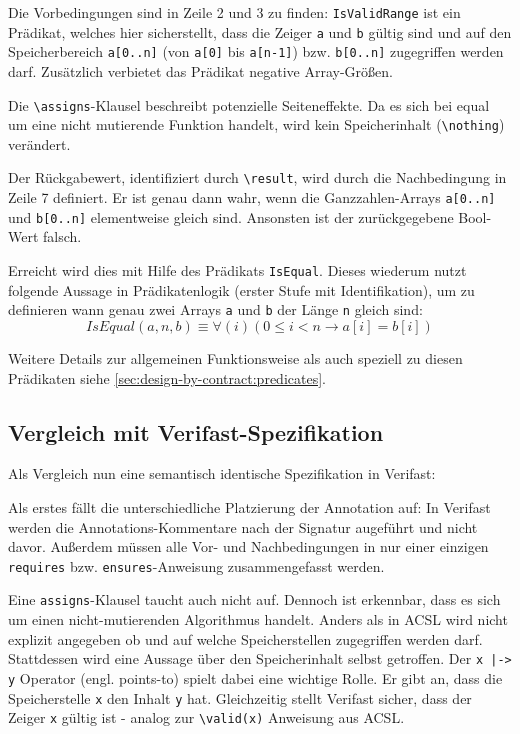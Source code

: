 Die Vorbedingungen sind in Zeile 2 und 3 zu finden: \lstinline{IsValidRange} ist ein Prädikat, welches hier sicherstellt,
dass die Zeiger \lstinline{a} und \lstinline{b} gültig sind und auf den Speicherbereich \lstinline{a[0..n]} 
(von \lstinline{a[0]} bis \lstinline{a[n-1]}) bzw. \lstinline{b[0..n]} zugegriffen 
werden darf. Zusätzlich verbietet das Prädikat negative Array-Größen.

Die \lstinline{\assigns}-Klausel beschreibt potenzielle Seiteneffekte. Da es sich bei equal um eine nicht mutierende
Funktion handelt, wird kein Speicherinhalt (\lstinline{\nothing}) verändert.

Der Rückgabewert, identifiziert durch \lstinline{\result}, wird durch die Nachbedingung in Zeile 7 definiert. Er ist genau dann
wahr, wenn die Ganzzahlen-Arrays \lstinline{a[0..n]} und \lstinline{b[0..n]} elementweise gleich sind. Ansonsten ist der 
zurückgegebene Bool-Wert falsch. 

Erreicht wird dies mit Hilfe des Prädikats \lstinline{IsEqual}. Dieses wiederum
nutzt folgende Aussage in Prädikatenlogik (erster Stufe mit Identifikation), um zu definieren wann genau 
zwei Arrays \lstinline{a} und \lstinline{b} der Länge \lstinline{n} gleich sind:
\[IsEqual(a, n, b) \equiv \forall(i) (0 \leq i < n \rightarrow a[i] = b[i])\]

Weitere Details zur allgemeinen Funktionsweise als auch speziell zu diesen Prädikaten siehe
\ref{sec:design-by-contract:predicates}.



\subsection{Vergleich mit Verifast-Spezifikation}
\label{sec:design-by-contract:verifast-variante}

Als Vergleich nun eine semantisch identische Spezifikation in Verifast:



Als erstes fällt die unterschiedliche Platzierung der Annotation auf: In Verifast werden die 
Annotations-Kommentare nach der Signatur augeführt und nicht davor. Außerdem müssen alle Vor- und 
Nachbedingungen in nur einer einzigen \lstinline{requires} bzw. \lstinline{ensures}-Anweisung 
zusammengefasst werden.

Eine \lstinline{assigns}-Klausel taucht auch nicht auf. Dennoch ist erkennbar, dass es sich um einen 
nicht-mutierenden Algorithmus handelt. Anders als in ACSL wird nicht explizit angegeben ob und auf welche 
Speicherstellen zugegriffen werden darf. Stattdessen wird eine Aussage über den Speicherinhalt selbst 
getroffen. Der \lstinline{x |-> y} Operator (engl. points-to) spielt dabei eine wichtige Rolle. Er gibt an, 
dass die Speicherstelle \lstinline{x} den Inhalt \lstinline{y} hat. Gleichzeitig stellt Verifast sicher, 
dass der Zeiger \lstinline{x} gültig ist - analog zur \lstinline{\valid(x)} Anweisung aus ACSL.

